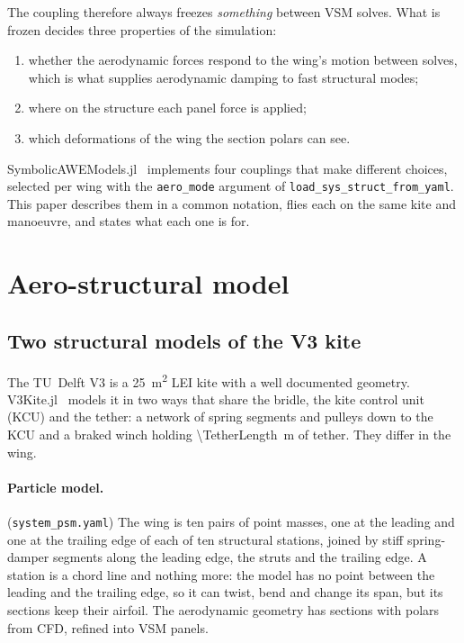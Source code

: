 \documentclass[11pt,a4paper]{article}
\newcommand{\code}[1]{\texttt{#1}}
\begin{document}
The coupling therefore always freezes \emph{something} between VSM solves. What is frozen decides three properties of the simulation:
\begin{enumerate}
  \item whether the aerodynamic forces respond to the wing's motion between solves, which is what supplies aerodynamic damping to fast structural modes;
  \item where on the structure each panel force is applied;
  \item which deformations of the wing the section polars can see.
\end{enumerate}
SymbolicAWEModels.jl~\citep{symbolicawemodels} implements four couplings that make different choices, selected per wing with the \code{aero\_mode} argument of \code{load\_sys\_struct\_from\_yaml}. This paper describes them in a common notation, flies each on the same kite and manoeuvre, and states what each one is for.

\section{Aero-structural model}

\subsection{Two structural models of the V3 kite}

The TU~Delft V3 is a \SI{25}{m^2} LEI kite with a well documented geometry. V3Kite.jl~\citep{v3kite} models it in two ways that share the bridle, the kite control unit (KCU) and the tether: a network of spring segments and pulleys down to the KCU and a braked winch holding \SI{\TetherLength}{m} of tether. They differ in the wing.

\paragraph{Particle model.} (\code{system\_psm.yaml}) The wing is ten pairs of point masses, one at the leading and one at the trailing edge of each of ten structural stations, joined by stiff spring-damper segments along the leading edge, the struts and the trailing edge. A station is a chord line and nothing more: the model has no point between the leading and the trailing edge, so it can twist, bend and change its span, but its sections keep their airfoil. The aerodynamic geometry has \NumSectionsParticle{} sections with polars from CFD, refined into \NumPanelsParticle{} VSM panels.
\end{document}

